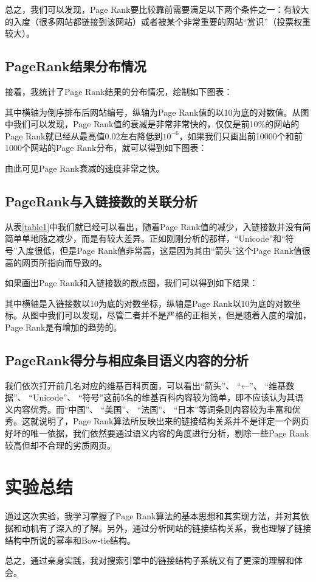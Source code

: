 \documentclass[paper=a4, fontsize=11pt, UTF8]{article} %
\numberwithin{equation}{section} %
\numberwithin{figure}{section} %
\numberwithin{table}{section} %
\begin{document}
总之，我们可以发现，Page Rank要比较靠前需要满足以下两个条件之一：有较大的入度（很多网站都链接到该网站）或者被某个非常重要的网站“赏识”（投票权重较大）。

\subsection{PageRank结果分布情况}

接着，我统计了Page Rank结果的分布情况，绘制如下图表：



\newpage

其中横轴为倒序排布后网站编号，纵轴为Page Rank值的以10为底的对数值。从图中我们可以发现，Page Rank值的衰减是非常非常快的，仅仅是前10\%的网站的Page Rank就已经从最高值0.02左右降低到$10^{-6}$，如果我们只画出前10000个和前1000个网站的Page Rank分布，就可以得到如下图表：


由此可见Page Rank衰减的速度非常之快。

\subsection{PageRank与入链接数的关联分析}

从表\ref{table1}中我们就已经可以看出，随着Page Rank值的减少，入链接数并没有简简单单地随之减少，而是有较大差异。正如刚刚分析的那样，“Unicode”和“符号”入度很低，但是Page Rank值非常高，这是因为其由“箭头”这个Page Rank值很高的网页所指向而导致的。

如果画出Page Rank和入链接数的散点图，我们可以得到如下结果：


其中横轴是入链接数以10为底的对数坐标，纵轴是Page Rank以10为底的对数坐标。从图中我们可以发现，尽管二者并不是严格的正相关，但是随着入度的增加，Page Rank是有增加的趋势的。

\subsection{PageRank得分与相应条目语义内容的分析}

我们依次打开前几名对应的维基百科页面，可以看出“箭头”、 “←”、 “维基数据”、 “Unicode”、 “符号”这前5名的维基百科内容较为简单，即不应该认为其语义内容优秀。而“中国”、 “美国”、 “法国”、 “日本”等词条则内容较为丰富和优秀。这就说明了，Page Rank算法所反映出来的链接结构关系并不是评定一个网页好坏的唯一依据，我们依然要通过语义内容的角度进行分析，剔除一些Page Rank较高但却不合理的劣质网页。

\section{实验总结}

通过这次实验，我学习掌握了Page Rank算法的基本思想和其实现方法，并对其依据和动机有了深入的了解。另外，通过分析网站的链接结构关系，我也理解了链接结构中所说的幂率和Bow-tie结构。

总之，通过亲身实践，我对搜索引擎中的链接结构子系统又有了更深的理解和体会。
\end{document}
